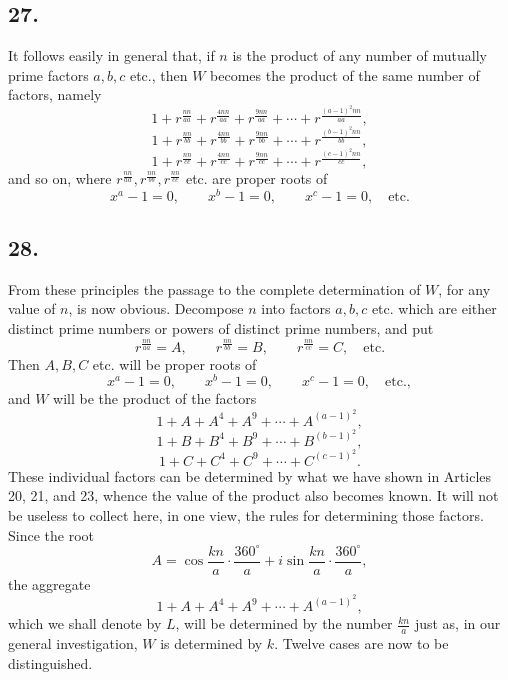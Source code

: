 \documentclass[12pt]{article}
\begin{document}
\subsection*{27.}

It follows easily in general that, if $n$ is the product of any number of mutually prime factors $a,b,c$ etc., then $W$ becomes the product of the same number of factors, namely
\[
1+r^{\frac{nn}{aa}}+r^{\frac{4nn}{aa}}+r^{\frac{9nn}{aa}}+\cdots+r^{\frac{(a-1)^2nn}{aa}},
\]
\[
1+r^{\frac{nn}{bb}}+r^{\frac{4nn}{bb}}+r^{\frac{9nn}{bb}}+\cdots+r^{\frac{(b-1)^2nn}{bb}},
\]
\[
1+r^{\frac{nn}{cc}}+r^{\frac{4nn}{cc}}+r^{\frac{9nn}{cc}}+\cdots+r^{\frac{(c-1)^2nn}{cc}},
\]
and so on, where $r^{\frac{nn}{aa}},r^{\frac{nn}{bb}},r^{\frac{nn}{cc}}$ etc. are proper roots of
\[
x^a-1=0,\qquad x^b-1=0,\qquad x^c-1=0,\quad\text{etc.}
\]

\subsection*{28.}

From these principles the passage to the complete determination of $W$, for any value of $n$, is now obvious. Decompose $n$ into factors $a,b,c$ etc. which are either distinct prime numbers or powers of distinct prime numbers, and put
\[
r^{\frac{nn}{aa}}=A,\qquad r^{\frac{nn}{bb}}=B,\qquad r^{\frac{nn}{cc}}=C,\quad\text{etc.}
\]
Then $A,B,C$ etc. will be proper roots of
\[
x^a-1=0,\qquad x^b-1=0,\qquad x^c-1=0,\quad\text{etc.},
\]
and $W$ will be the product of the factors
\[
1+A+A^4+A^9+\cdots+A^{(a-1)^2},
\]
\[
1+B+B^4+B^9+\cdots+B^{(b-1)^2},
\]
\[
1+C+C^4+C^9+\cdots+C^{(c-1)^2}.
\]
These individual factors can be determined by what we have shown in Articles 20, 21, and 23, whence the value of the product also becomes known. It will not be useless to collect here, in one view, the rules for determining those factors. Since the root
\[
A=\cos\frac{kn}{a}\cdot\frac{360^\circ}{a}+i\sin\frac{kn}{a}\cdot\frac{360^\circ}{a},
\]
the aggregate
\[
1+A+A^4+A^9+\cdots+A^{(a-1)^2},
\]
which we shall denote by $L$, will be determined by the number $\frac{kn}{a}$ just as, in our general investigation, $W$ is determined by $k$. Twelve cases are now to be distinguished.
\end{document}
